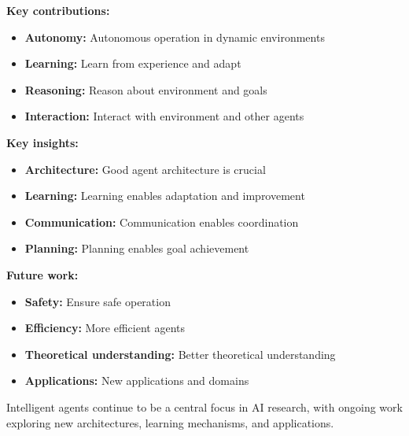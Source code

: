 \textbf{Key contributions:}
\begin{itemize}
    \item \textbf{Autonomy:} Autonomous operation in dynamic environments
    \item \textbf{Learning:} Learn from experience and adapt
    \item \textbf{Reasoning:} Reason about environment and goals
    \item \textbf{Interaction:} Interact with environment and other agents
\end{itemize}

\textbf{Key insights:}
\begin{itemize}
    \item \textbf{Architecture:} Good agent architecture is crucial
    \item \textbf{Learning:} Learning enables adaptation and improvement
    \item \textbf{Communication:} Communication enables coordination
    \item \textbf{Planning:} Planning enables goal achievement
\end{itemize}

\textbf{Future work:}
\begin{itemize}
    \item \textbf{Safety:} Ensure safe operation
    \item \textbf{Efficiency:} More efficient agents
    \item \textbf{Theoretical understanding:} Better theoretical understanding
    \item \textbf{Applications:} New applications and domains
\end{itemize}

Intelligent agents continue to be a central focus in AI research, with ongoing work exploring new architectures, learning mechanisms, and applications.
